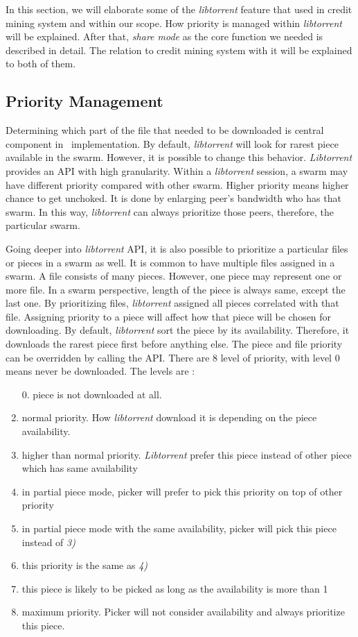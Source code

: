 In this section, we will elaborate some of the \textit{libtorrent} feature that used in credit mining system and within our scope. How priority is managed within \textit{libtorrent} will be explained. After that, \textit{share mode} as the core function we needed is described in detail. The relation to credit mining system with it will be explained to both of them.

\subsection{Priority Management}
Determining which part of the file that needed to be downloaded is central component in \bt~implementation. By default, \textit{libtorrent} will look for rarest piece available in the swarm. However, it is possible to change this behavior. \textit{Libtorrent} provides an API with high granularity. Within a \textit{libtorrent} session, a swarm may have different priority compared with other swarm. Higher priority means higher chance to get unchoked. It is done by enlarging peer's bandwidth who has that swarm. In this way, \textit{libtorrent} can always prioritize those peers, therefore, the particular swarm. 

Going deeper into \textit{libtorrent} API, it is also possible to prioritize a particular files or pieces in a swarm as well. It is common to have multiple files assigned in a swarm. A file consists of many pieces. However, one piece may represent one or more file. In a swarm perspective, length of the piece is always same, except the last one. By prioritizing files, \textit{libtorrent} assigned all pieces correlated with that file. Assigning priority to a piece will affect how that piece will be chosen for downloading. By default, \textit{libtorrent} sort the piece by its availability. Therefore, it downloads the rarest piece first before anything else. The piece and file priority can be overridden by calling the API. There are 8 level of priority, with level 0 means never be downloaded. The levels are : 

\begin{enumerate}[topsep=1pt,itemsep=0ex,partopsep=0pt,parsep=2pt]
	\itemsep0em 
	\item[0.] piece is not downloaded at all.
	\item normal priority. How \textit{libtorrent} download it is depending on the piece availability.
	\item higher than normal priority. \textit{Libtorrent} prefer this piece instead of other piece which has same availability
	\item in partial piece mode, picker will prefer to pick this priority on top of other priority
	\item in partial piece mode with the same availability, picker will pick this piece instead of \textit{3)}
	\item this priority is the same as \textit{4)}
	\item this piece is likely to be picked as long as the availability is more than 1
	\item maximum priority. Picker will not consider availability and always prioritize this piece.
\end{enumerate}

